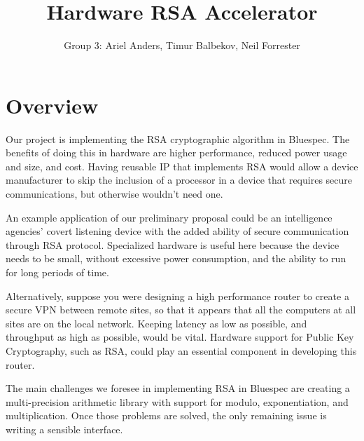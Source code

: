 \documentclass[12pt]{article}
\title{Hardware RSA Accelerator}
\author{Group 3: Ariel Anders, Timur Balbekov, Neil Forrester}
\begin{document}
\maketitle

\section{Overview}
Our project is implementing the RSA cryptographic algorithm in Bluespec.
The benefits of doing this in hardware are higher performance, reduced power usage and size, and cost.
Having reusable IP that implements RSA would allow a device manufacturer to skip the inclusion
of a processor in a device that requires secure communications, but otherwise wouldn't need one. 

An example application of our preliminary proposal could be an intelligence agencies' covert listening device
with the added ability of secure communication through RSA protocol.
Specialized hardware is useful here because the device needs to be small,
without excessive power consumption, and the ability to run for long periods of time. 

Alternatively, suppose you were designing a high performance router to create a secure VPN between remote sites,
so that it appears that all the computers at all sites are on the local network.
Keeping latency as low as possible, and throughput as high as possible, would be vital.
Hardware support for Public Key Cryptography, such as RSA,
could play an essential component in developing this router.

The main challenges we foresee in implementing RSA in Bluespec are creating a multi-precision arithmetic library
with support for modulo, exponentiation, and multiplication.
Once those problems are solved, the only remaining issue is writing a sensible interface.
\end{document}
